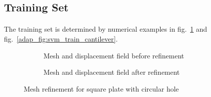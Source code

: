 \subsection{Training Set}
\paragraph{}
The training set is determined by numerical examples in fig.~\ref{adap_fig:svm_train_chole} and fig.~\ref{adap_fig:svm_train_cantilever}.
\begin{figure}[!ht]
    \centering
    \begin{subfigure}[b]{0.5\linewidth}
        \caption{Mesh and displacement field before refinement}
    \end{subfigure}
    \begin{subfigure}[b]{0.5\linewidth}
        \caption{Mesh and displacement field after refinement}
    \end{subfigure}
    \caption{Mesh refinement for square plate with circular hole \cite{Duval2018}}
    \label{adap_fig:svm_train_chole}
\end{figure}

